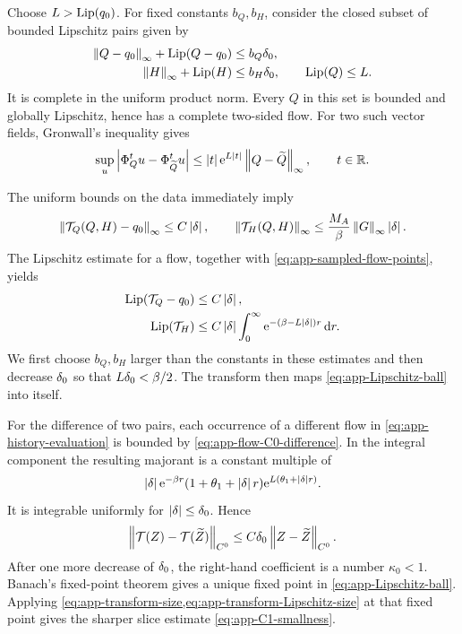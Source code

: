 Choose \(L>\operatorname{Lip}(q_0)\).  For fixed constants \(b_Q,b_H\), consider the
closed subset of bounded Lipschitz pairs given by
\begin{equation}
\label{eq:app-Lipschitz-ball}
\begin{aligned}
 \left\lVert Q-q_0\right\rVert_\infty+\operatorname{Lip}(Q-q_0)&\leq b_Q\delta_0,\\
 \left\lVert H\right\rVert_\infty+\operatorname{Lip}(H)&\leq b_H\delta_0,
 \qquad \operatorname{Lip}(Q)\leq L.
\end{aligned}
\end{equation}
It is complete in the uniform product norm.  Every \(Q\) in this set is
bounded and globally Lipschitz, hence has a complete two-sided flow.
For two such vector fields, Gronwall's inequality gives
\begin{equation}
\label{eq:app-flow-C0-difference}
 \sup_u\left\lvert \Phi_Q^t u-\Phi_{\widetilde Q}^t u\right\rvert
 \leq \left\lvert t\right\rvert\mathrm e^{L\left\lvert t\right\rvert}
       \left\lVert Q-\widetilde Q\right\rVert_\infty,
 \qquad t\in\mathbb R.
\end{equation}

The uniform bounds on the data immediately imply
\begin{equation}
\label{eq:app-transform-size}
 \left\lVert \mathcal T_Q(Q,H)-q_0\right\rVert_\infty\leq C\left\lvert \delta\right\rvert,
 \qquad
 \left\lVert \mathcal T_H(Q,H)\right\rVert_\infty
 \leq \frac{M_A}{\beta}\left\lVert G\right\rVert_\infty\left\lvert \delta\right\rvert.
\end{equation}
The Lipschitz estimate for a flow, together with
\cref{eq:app-sampled-flow-points}, yields
\begin{equation}
\label{eq:app-transform-Lipschitz-size}
\begin{aligned}
 \operatorname{Lip}(\mathcal T_Q-q_0)&\leq C\left\lvert \delta\right\rvert,\\
 \operatorname{Lip}(\mathcal T_H)&\leq
 C\left\lvert \delta\right\rvert\int_0^\infty
       \mathrm e^{-(\beta-L\left\lvert \delta\right\rvert)r}\,\mathrm d r.
\end{aligned}
\end{equation}
We first choose \(b_Q,b_H\) larger than the constants in these estimates
and then decrease \(\delta_0\) so that \(L\delta_0<\beta/2\).  The transform
then maps \cref{eq:app-Lipschitz-ball} into itself.

For the difference of two pairs, each occurrence of a different flow in
\cref{eq:app-history-evaluation} is bounded by
\cref{eq:app-flow-C0-difference}.  In the integral component the resulting
majorant is a constant multiple of
\[
 \left\lvert \delta\right\rvert\mathrm e^{-\beta r}
 (1+\theta_1+\left\lvert \delta\right\rvert r)
 \mathrm e^{L(\theta_1+\left\lvert \delta\right\rvert r)}.
\]
It is integrable uniformly for \(\left\lvert \delta\right\rvert\leq\delta_0\).  Hence
\begin{equation}
\label{eq:app-C0-contraction}
 \left\lVert \mathcal T(Z)-\mathcal T(\widetilde Z)\right\rVert_{C^0}
 \leq C\delta_0\left\lVert Z-\widetilde Z\right\rVert_{C^0}.
\end{equation}
After one more decrease of \(\delta_0\), the right-hand coefficient is a
number \(\kappa_0<1\).  Banach's fixed-point theorem gives a unique fixed
point in \cref{eq:app-Lipschitz-ball}.  Applying
\cref{eq:app-transform-size,eq:app-transform-Lipschitz-size} at that fixed
point gives the sharper slice estimate \cref{eq:app-C1-smallness}.

